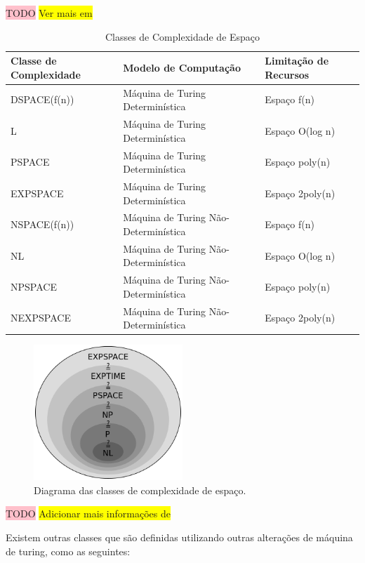 \documentclass[submission,copyright,creativecommons]{eptcs}
\begin{document}
\colorbox{pink}{TODO}
\colorbox{yellow}{Ver mais em \cite{ufpr}}

\begin{table}[!ht]
\centering
\caption{Classes de Complexidade de Espaço}
\label{my-label}
\begin{tabular}{|l|l|l|}
\hline
Classe de Complexidade & Modelo de Computação & Limitação de Recursos \\ \hline
DSPACE(f(n)) & Máquina de Turing Determinística     & Espaço f(n)     \\ \hline
L            & Máquina de Turing Determinística     & Espaço O(log n) \\ \hline
PSPACE       & Máquina de Turing Determinística     & Espaço poly(n)  \\ \hline
EXPSPACE     & Máquina de Turing Determinística     & Espaço 2poly(n) \\ \hline
NSPACE(f(n)) & Máquina de Turing Não-Determinística & Espaço f(n)     \\ \hline
NL           & Máquina de Turing Não-Determinística & Espaço O(log n) \\ \hline
NPSPACE      & Máquina de Turing Não-Determinística & Espaço poly(n)  \\ \hline
NEXPSPACE    & Máquina de Turing Não-Determinística & Espaço 2poly(n) \\ \hline
\end{tabular}
\end{table}

\begin{figure}[h]
\caption{Diagrama das classes de complexidade de espaço\cite{wiki}.}
\centering
\includegraphics[width=0.5\textwidth]{pictures/classes.png}
\end{figure}

\colorbox{pink}{TODO}
\colorbox{yellow}{Adicionar mais informações de \cite{wiki}}

Existem outras classes que são definidas utilizando outras alterações de máquina de turing, como as seguintes:
\end{document}

